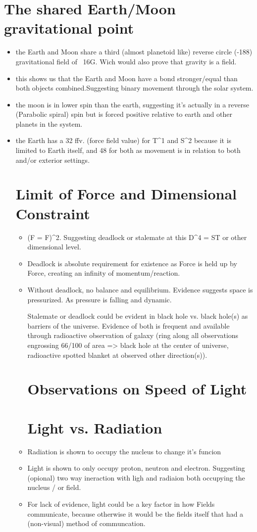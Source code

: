 \documentclass[12pt]{thesis}
\begin{document}
\section{The shared Earth/Moon gravitational point}
\begin{itemize}
	\item the Earth and Moon share a third (almost planetoid like) reverse circle (-188) gravitational field of ~16G. Wich would also prove that gravity is a field.
 	\item this shows us that the Earth and Moon have a bond stronger/equal than both objects combined.Suggesting binary movement through the solar system.
  	\item the moon is in lower spin than the earth, suggesting it's actually in a reverse (Parabolic spiral) spin but is forced positive relative to earth and other planets in the system.
   	\item the Earth has a 32 ffv. (force field value) for T^1 and S^2 because it is limited to Earth itself, and 48 for both as movement is in relation to both and/or exterior settings.
 		
\section{Limit of Force and Dimensional Constraint}
\begin{itemize}
	\item (F = F)^2. Suggesting deadlock or stalemate at this D^4 = ST or other dimensional level. 
 	\item Deadlock is absolute requirement for existence as Force is held up by Force, creating an infinity of momentum/reaction. 
        \item Without deadlock, no balance and equilibrium. Evidence suggests space is pressurized. As pressure is falling and dynamic.  

 Stalemate or deadlock could be evident in black hole vs. black hole(s) as barriers of the universe. 
 Evidence of both is frequent and available through radioactive observation of galaxy (ring along all observations engrossing 66/100 of area => black hole at the center of universe, radioactive 
 spotted blanket at observed other direction(s)).

 \section{Observations on Speed of Light}

 \section{Light vs. Radiation}
 \item Radiation is shown to occupy the nucleus to change it's funcion
 \item Light is shown to only occupy proton, neutron and electron. Suggesting (opional) two way ineraction with ligh and radiaion both occupying the nucleus / or field.
 \item For lack of evidence, light could be a key factor in how Fields communicate, because otherwise it would be the fields itself that had a (non-visual) method of communcation.
	

\end{itemize}
\end{itemize}
\end{document}
